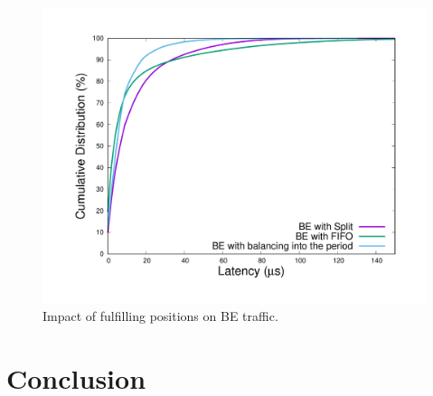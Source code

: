 \documentclass[10pt, conference, letterpaper]{IEEEtran}
\begin{document}
\begin{figure}[h!]
\begin{center}   

      \includegraphics[scale=0.25]{splitres}
     \caption{Impact of fulfilling positions on BE traffic.}   \label{fig:splitres}
\end{center}
  \end{figure}
  
  \section*{Conclusion}
  
  
  

\end{document}
